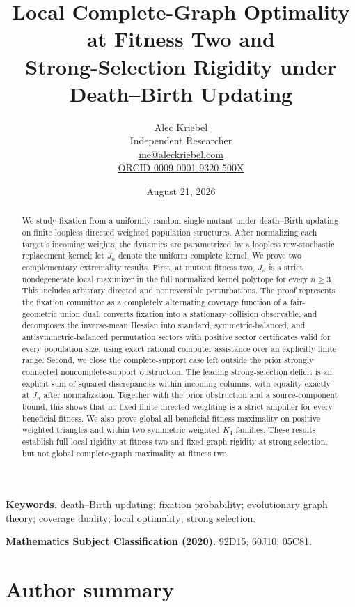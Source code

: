 \documentclass[11pt]{article}
\title{Local Complete-Graph Optimality at Fitness Two and\\
Strong-Selection Rigidity under Death--Birth Updating}
\author{Alec Kriebel\\Independent Researcher\\
\href{mailto:me@aleckriebel.com}{me@aleckriebel.com}\\
\href{https://orcid.org/0009-0001-9320-500X}{ORCID 0009-0001-9320-500X}}
\date{August 21, 2026}
\begin{document}
\maketitle

\begin{abstract}
We study fixation from a uniformly random single mutant under death--Birth
updating on finite loopless directed weighted population structures.  After
normalizing each target's incoming weights, the dynamics are parametrized by
a loopless row-stochastic replacement kernel; let $J_n$ denote the uniform
complete kernel.  We prove two complementary extremality results.  First, at
mutant fitness two, $J_n$ is a strict nondegenerate local maximizer in the
full normalized kernel polytope for every $n\ge3$.  This includes arbitrary
directed and nonreversible perturbations.  The proof represents
the fixation committor as a completely alternating coverage function of a
fair-geometric union dual, converts fixation into a stationary collision
observable, and decomposes the inverse-mean Hessian into standard,
symmetric-balanced, and antisymmetric-balanced permutation sectors with
positive sector certificates valid for every population size, using exact
rational computer assistance over an explicitly finite range.
Second, we close the complete-support case left outside the prior strongly
connected noncomplete-support obstruction.  The leading
strong-selection deficit is an explicit sum of squared discrepancies within
incoming columns, with equality exactly at $J_n$ after normalization.
Together with the prior obstruction and a source-component bound,
this shows that no fixed finite directed weighting is a strict amplifier for
every beneficial fitness.  We also prove
global all-beneficial-fitness maximality on positive weighted triangles and
within two symmetric weighted $K_4$ families.  These results establish full local
rigidity at fitness two and fixed-graph rigidity at strong selection, but
not global complete-graph maximality at fitness two.
\end{abstract}

\noindent\textbf{Keywords.}
death--Birth updating; fixation probability; evolutionary graph theory;
coverage duality; local optimality; strong selection.

\medskip
\noindent\textbf{Mathematics Subject Classification (2020).}
92D15; 60J10; 05C81.

\section*{Author summary}
\end{document}
